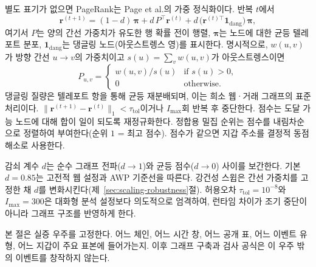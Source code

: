 별도 표기가 없으면 PageRank는 Page et al.의 가중 정식화이다. 반복 $t$에서
\begin{equation}
\label{eq:pagerank}
\mathbf{r}^{(t+1)}
=
(1-d)\,\boldsymbol{\pi}
+
d\,P^{\top}\mathbf{r}^{(t)}
+
d\,\bigl(\mathbf{r}^{(t)\top}\mathbf{1}_{\mathrm{dang}}\bigr)\,\boldsymbol{\pi},
\end{equation}
여기서 $P$는 양의 간선 가중치가 유도한 행 확률 전이 행렬, $\boldsymbol{\pi}$는 노드에 대한 균등 텔레포트 분포, $\mathbf{1}_{\mathrm{dang}}$는 댕글링 노드(아웃스트렝스 영)를 표시한다. 명시적으로, $w(u,v)$가 방향 간선 $u\to v$의 가중치이고 $s(u)=\sum_v w(u,v)$가 아웃스트렝스이면
\begin{equation}
\label{eq:transition-impl}
P_{u,v}
=
\begin{cases}
w(u,v)/s(u) & \text{if }s(u)>0,\\
0 & \text{otherwise.}
\end{cases}
\end{equation}
댕글링 질량은 텔레포트 항을 통해 균등 재분배되며, 이는 희소 웹·거래 그래프의 표준 처리이다. $\|\mathbf{r}^{(t+1)}-\mathbf{r}^{(t)}\|_1 < \tau_{\mathrm{tol}}$이거나 $I_{\max}$회 반복 후 중단한다. 점수는 도달 가능 노드에 대해 합이 일이 되도록 재정규화한다. 정합용 밀집 순위는 점수를 내림차순으로 정렬하여 부여한다(순위 $1$ = 최고 점수). 점수가 같으면 지갑 주소를 결정적 동점 해소로 사용한다.

감쇠 계수 $d$는 순수 그래프 전파($d\to 1$)와 균등 점수($d\to 0$) 사이를 보간한다. 기본 $d=0.85$는 고전적 웹 설정과 AWP 기준선을 따른다. 강건성 스윕은 간선 가중치를 고정한 채 $d$를 변화시킨다(제~\ref{sec:scaling-robustness}절). 허용오차 $\tau_{\mathrm{tol}}=10^{-8}$와 $I_{\max}=300$은 대화형 분석 설정보다 의도적으로 엄격하여, 런타임 차이가 조기 중단이 아니라 그래프 구조를 반영하게 한다.


본 절은 실증 우주를 고정한다. 어느 체인, 어느 시간 창, 어느 공개 표, 어느 이벤트 유형, 어느 지갑이 주요 표본에 들어가는지. 이후 그래프 구축과 검사 공식은 이 우주 밖의 이벤트를 창작하지 않는다.

